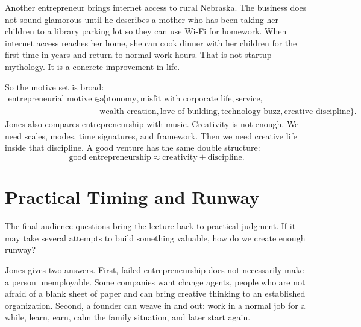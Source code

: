 Another entrepreneur brings internet access to rural Nebraska. The business does not sound glamorous until he describes a mother who has been taking her children to a library parking lot so they can use Wi-Fi for homework. When internet access reaches her home, she can cook dinner with her children for the first time in years and return to normal work hours. That is not startup mythology. It is a concrete improvement in life.

So the motive set is broad:
\begin{align}
\text{entrepreneurial motive}
\in
\{&
\text{autonomy},
\text{misfit with corporate life},
\text{service},\\
&
\text{wealth creation},
\text{love of building},
\text{technology buzz},
\text{creative discipline}
\}.
\end{align}
Jones also compares entrepreneurship with music. Creativity is not enough. We need scales, modes, time signatures, and framework. Then we need creative life inside that discipline. A good venture has the same double structure:
\begin{equation}
\text{good entrepreneurship}
\approx
\text{creativity}+\text{discipline}.
\end{equation}

\section{Practical Timing and Runway}

The final audience questions bring the lecture back to practical judgment. If it may take several attempts to build something valuable, how do we create enough runway?

Jones gives two answers. First, failed entrepreneurship does not necessarily make a person unemployable. Some companies want change agents, people who are not afraid of a blank sheet of paper and can bring creative thinking to an established organization. Second, a founder can weave in and out: work in a normal job for a while, learn, earn, calm the family situation, and later start again.

